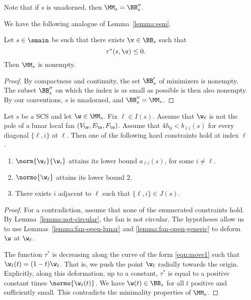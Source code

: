 Note that if $s$ is unadorned, then $\MM_s = \BB''_s$.


We have the following analogue of Lemma~\ref{lemma:esm}.

\begin{lemma}\label{lemma:init}
Let $s\in \smain$ be such that
there exists $\v\in \BB_s$ such that
\[
\tau^*(s,\v)\le 0.
\]
Then $\MM_s$ is nonempty.
\end{lemma}

\begin{proof}    By compactness and continuity, the set 
$\BB'_s$ of minimizers is nonempty.   
The subset $\BB''_s$ on which the index is as small as possible
is then also nonempty.  By our conventions, $s$ is unadorned, and
  $\BB''_s = \MM_s$.
\end{proof}


\begin{lemma}\label{lemma:odx2} 
Let $s$ be a SCS and let $\w\in \MM_s$.  Fix $\ell\in I(s)$.
Assume  that $\w_\ell$ is not the pole of a lunar local fan $(V_\w,E_\w,F_\w)$.
Assume that $4h_0 < b_{\ell i}(s)$ for every diagonal $\{\ell,i\}$ at $\ell$.
Then one of the following hard  constraints hold at index $\ell$.
\begin{enumerate}
\item $\norm{\w_\ell}{\w_i}$ attains its lower bound $a_{\ell i}(s)$, for
  some $i\ne \ell$.
\item $\normo{\w_\ell}$ attains its lower bound $2$.
\item There exists $i$ adjacent to $\ell$ such that $\{\ell,i\}\in J(s)$.
\end{enumerate}
\end{lemma}

\begin{proof} 
For a contradiction, assume that none of the enumerated constraints hold.
By Lemma~\ref{lemma:not-circular}, the fan is not circular.
The hypotheses
allow us to use Lemmas~\ref{lemma:fan-open-lunar} and
\ref{lemma:fan-open-generic} to deform $\w$ at $\w_\ell$.

The function $\tau^*$ is decreasing along
the curve of the form \eqref{eqn:move1} such that
$\w_\ell(t)=(1-t) \w_\ell$.
That is, we push the point $\w_\ell$ radially towards the origin.
Explicitly, along this deformation, up to a constant, $\tau^*$ is equal
to a positive constant times $\normo{\w_\ell(t)}$.
We have
$\w(t)\in \BB_s$ for all $t$ positive and sufficiently
small.  This contradicts the minimality properties of $\MM_s$.
\end{proof}

